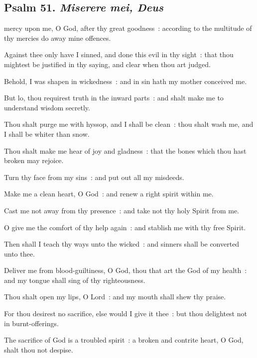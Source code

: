 \subsection{Psalm 51. \textit{Miserere mei, Deus}}
 mercy upon me, O God, after thy great goodness~: according to the multitude of thy mercies do away mine offences.\par
{}
Against thee only have I sinned, and done this evil in thy sight~: that thou mightest be justified in thy saying, and clear when thou art judged.\par
{}Behold, I was shapen in wickedness~: and in sin hath my mother conceived me.\par
{}But lo, thou requirest truth in the inward parts~: and shalt make me to understand wisdom secretly.\par
{}Thou shalt purge me with hyssop, and I shall be clean~: thou shalt wash me, and I shall be whiter than snow.\par
{}Thou shalt make me hear of joy and gladness~: that the bones which thou hast broken may rejoice.\par
{}Turn thy face from my sins~: and put out all my misdeeds.\par
{}Make me a clean heart, O God~: and renew a right spirit within me.\par
{}Cast me not away from thy presence~: and take not thy holy Spirit from me.\par
{}O give me the comfort of thy help again~: and stablish me with thy free Spirit.\par
{}Then shall I teach thy ways unto the wicked~: and sinners shall be converted unto thee.\par
{}Deliver me from blood-guiltiness, O God, thou that art the God of my health~: and my tongue shall sing of thy righteousness.\par
{}Thou shalt open my lips, O Lord~: and my mouth shall shew thy praise.\par
{}For thou desirest no sacrifice, else would I give it thee~: but thou delightest not in burnt-offerings.\par
{}The sacrifice of God is a troubled spirit~: a broken and contrite heart, O God, shalt thou not despise.\par
